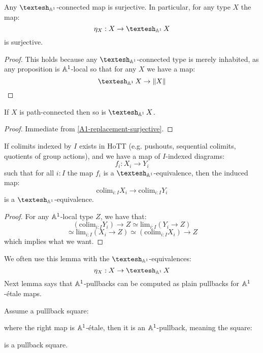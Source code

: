 \begin{lemma}\label{A1-replacement-surjective}
Any $\shape_{\A^1}$-connected map is surjective. In particular, for any type $X$ the map:
\[\eta_X:X\to \shape_{\A^1}X\]
is surjective.
\end{lemma}

\begin{proof}
This holds because any $\shape_{\A^1}$-connected type is merely inhabited, as any proposition is $\mathbb{A}^1$-local so that for any $X$ we have a map:
\[\shape_{\A^1}X \to \propTrunc{X}\]
\end{proof}

\begin{lemma}
If $X$ is path-connected then so is $\shape_{\A^1}X$.
\end{lemma}

\begin{proof}
Immediate from \cref{A1-replacement-surjective}.
\end{proof}

\begin{lemma}\label{colimit-shape}
If colimits indexed by $I$ exists in HoTT (e.g. pushouts, sequential colimits, quotients of group actions), and we have a map of $I$-indexed diagrams:
\[f_i : X_i \to Y_i\]
such that for all $i:I$ the map $f_i$ is a $\shape_{\A^1}$-equivalence, then the induced map: 
\[\mathrm{colim}_{i:I} X_i \to \mathrm{colim}_{i:I} Y_i\]
is a $\shape_{\A^1}$-equivalence.
\end{lemma}

\begin{proof}
For any $\mathbb{A}^1$-local type $Z$, we have that:
\[(\mathrm{colim}_{i:I} Y_i) \to Z \simeq \mathrm{lim}_{i:I} (Y_i \to Z)\]
\[\simeq \mathrm{lim}_{i:I} (X_i \to Z) \simeq (\mathrm{colim}_{i:I} X_i) \to Z\]
which implies what we want.
\end{proof}

We often use this lemma with the $\shape_{\A^1}$-equivalences:
\[\eta_X : X \to \shape_{\A^1} X\]
Next lemma says that $\mathbb{A}^1$-pullbacks can be computed as plain pullbacks for $\mathbb{A}^1$-étale maps.

\begin{lemma}
Assume a pulllback square:
  \begin{center}
  \end{center}
  where the right map is $\mathbb{A}^1$-étale, then it is an $\mathbb{A}^1$-pullback, meaning the square:  
  \begin{center}
  \end{center}
  is a pullback square.
\end{lemma}

